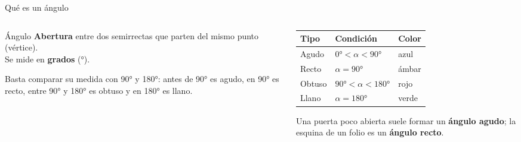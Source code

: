 \documentclass[aspectratio=169, 10pt, spanish]{beamer}
\begin{document}
\begin{frame}{Qué es un ángulo}
  \begin{columns}[c]
    \begin{column}{0.48\textwidth}
      \begin{definicionbox}{Ángulo}
        \AlmFontSmall
        \textbf{Abertura} entre dos semirrectas
        que parten del mismo punto (vértice).\\
        Se mide en \textbf{grados} (°).
      \end{definicionbox}
      \vspace{8pt}
      \begin{notabox}
        \AlmFontFootnote
        Basta comparar su medida con 90° y 180°:
        antes de 90° es agudo, en 90° es recto,
        entre 90° y 180° es obtuso y en 180° es llano.
      \end{notabox}
    \end{column}
    \begin{column}{0.46\textwidth}
      {\AlmFontSmall
      \begin{tabular}{@{}lll@{}}
        \toprule
        \textbf{Tipo} & \textbf{Condición} & \textbf{Color}\\
        \midrule
        Agudo   & $0° < \alpha < 90°$
          & \textcolor{AlmAzulM}{azul}\\
        Recto   & $\alpha = 90°$
          & \textcolor{AlmAmbar!80!black}{ámbar}\\
        Obtuso  & $90° < \alpha < 180°$
          & \textcolor{AlmTerra}{rojo}\\
        Llano   & $\alpha = 180°$
          & \textcolor{AlmVerde}{verde}\\
        \bottomrule
      \end{tabular}}
      \vspace{8pt}
      \begin{ejemplobox}
        \AlmFontFootnote
        Una puerta poco abierta suele formar un
        \textbf{ángulo agudo}; la esquina de un folio
        es un \textbf{ángulo recto}.
      \end{ejemplobox}
    \end{column}
  \end{columns}
\end{frame}
\end{document}
